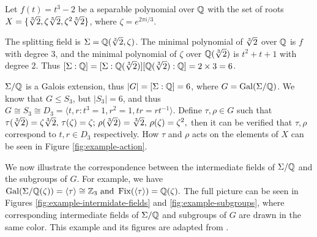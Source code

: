 \begin{example}
	
	Let $f(t) = t^3 - 2$ be a separable polynomial over $\mathbb Q$ with the set of roots $X = \{ \sqrt[3]{2}, \zeta \sqrt[3]{2}, \zeta^2 \sqrt[3]{2} \}$, where $\zeta = e^{2\pi i / 3}$. 
	
	The splitting field is $\Sigma = \mathbb Q(\sqrt[3]{2}, \zeta)$. The minimal polynomial of $\sqrt[3]{2}$ over $\mathbb Q$ is $f$ with degree $3$, and the minimal polynomial of $\zeta$ over $\mathbb Q(\sqrt[3]{2})$ is $t^2 + t + 1$ with degree $2$. Thus $[\Sigma : \mathbb Q] = [\Sigma : \mathbb Q(\sqrt[3]{2})] [\mathbb Q(\sqrt[3]{2}) : \mathbb Q] = 2 \times 3 = 6$. 
	
	$\Sigma / \mathbb Q$ is a Galois extension, thus $|G| = [\Sigma : \mathbb Q] = 6$, where $G = \operatorname{Gal}(\Sigma / \mathbb Q)$. We know that $G \le S_3$, but $|S_3| = 6$, and thus $G \cong S_3 \cong D_3 = \langle t, r : t^3 = 1, r^2 = 1, tr = rt^{-1} \rangle$. Define $\tau, \rho \in G$ such that 
	$
		\tau(\sqrt[3]{2}) = \zeta \sqrt[3]{2}, \, \tau(\zeta) = \zeta; \, \rho(\sqrt[3]{2}) = \sqrt[3]{2}, \,  \rho(\zeta) = \zeta ^ 2,
	$
	then it can be verified that $\tau, \rho$ correspond to $t, r \in D_3$ respectively. How $\tau$ and $\rho$ acts on the elements of $X$ can be seen in Figure \ref{fig:example-action}.
	
	We now illustrate the correspondence between the intermediate fields of $\Sigma / \mathbb Q$ and the subgroups of $G$. For example, we have $\operatorname{Gal}(\Sigma / \mathbb Q(\zeta)) = \langle \tau \rangle \cong \mathbb Z_3 \text{ and } \operatorname{Fix}(\langle \tau \rangle) = \mathbb Q(\zeta). $ The full picture can be seen in Figures \ref{fig:example-intermidate-fields} and \ref{fig:example-subgroups}, where corresponding intermediate fields of $\Sigma / \mathbb Q$ and subgroups of $G$ are drawn in the same color. This example and its figures are adapted from \cite{visual-algebra}. 
	
\end{example}

